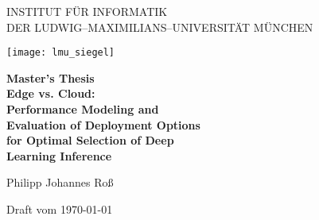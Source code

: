
\thispagestyle{empty}

\begin{center}

\vspace*{-2cm}

{\Huge INSTITUT F\"UR INFORMATIK\\[1mm]}
DER LUDWIG--MAXIMILIANS--UNIVERSITÄT MÜNCHEN\\

\vspace*{1cm}

\texttt{[image: lmu\_siegel]}

\vspace*{2cm}

{\Large \textbf{Master's Thesis}}\\ %

\vspace{2.0cm}
{\Huge \textbf{Edge vs. Cloud:}}\\
\vspace*{2.0mm}
{\Huge \textbf{Performance Modeling and}}\\
\vspace*{2.0mm}
{\Huge \textbf{Evaluation of Deployment Options}}\\
 \vspace*{2.0mm}
{\Huge \textbf{for Optimal Selection of Deep}}\\
 \vspace*{2.0mm}
{\Huge \textbf{Learning Inference}}\\
\vspace{1.5cm}

{\LARGE Philipp Johannes Roß} %

\vspace{3cm}
Draft vom \today %

\end{center}

\newpage


\thispagestyle{empty}
\cleardoublepage


\thispagestyle{empty}

